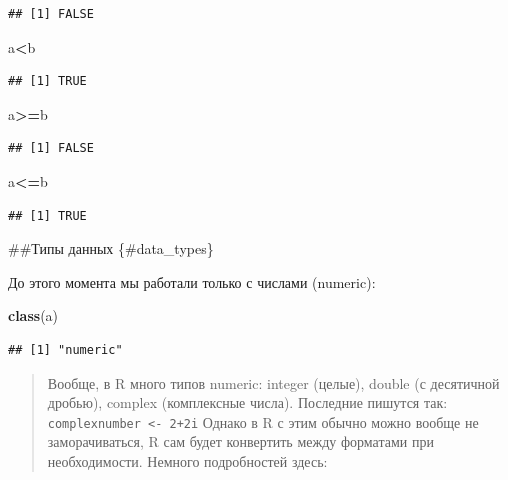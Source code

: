 \documentclass[]{book}
\newenvironment{Shaded}{\begin{snugshade}}{\end{snugshade}}
\newcommand{\KeywordTok}[1]{\textcolor[rgb]{0.13,0.29,0.53}{\textbf{#1}}}
\newcommand{\NormalTok}[1]{#1}
\newcommand{\OperatorTok}[1]{\textcolor[rgb]{0.81,0.36,0.00}{\textbf{#1}}}
\begin{document}
\begin{verbatim}
## [1] FALSE
\end{verbatim}

\begin{Shaded}
\begin{Highlighting}[]
\NormalTok{a}\OperatorTok{<}\NormalTok{b}
\end{Highlighting}
\end{Shaded}

\begin{verbatim}
## [1] TRUE
\end{verbatim}

\begin{Shaded}
\begin{Highlighting}[]
\NormalTok{a}\OperatorTok{>=}\NormalTok{b}
\end{Highlighting}
\end{Shaded}

\begin{verbatim}
## [1] FALSE
\end{verbatim}

\begin{Shaded}
\begin{Highlighting}[]
\NormalTok{a}\OperatorTok{<=}\NormalTok{b}
\end{Highlighting}
\end{Shaded}

\begin{verbatim}
## [1] TRUE
\end{verbatim}

\#\#Типы данных \{\#data\_types\}

До этого момента мы работали только с числами (numeric):

\begin{Shaded}
\begin{Highlighting}[]
\KeywordTok{class}\NormalTok{(a)}
\end{Highlighting}
\end{Shaded}

\begin{verbatim}
## [1] "numeric"
\end{verbatim}

\begin{quote}
Вообще, в R много типов numeric: integer (целые), double (с десятичной дробью), complex (комплексные числа). Последние пишутся так: \texttt{complexnumber\ \textless{}-\ 2+2i}
Однако в R с этим обычно можно вообще не заморачиваться, R сам будет конвертить между форматами при необходимости. Немного подробностей здесь:
\end{quote}
\end{document}
